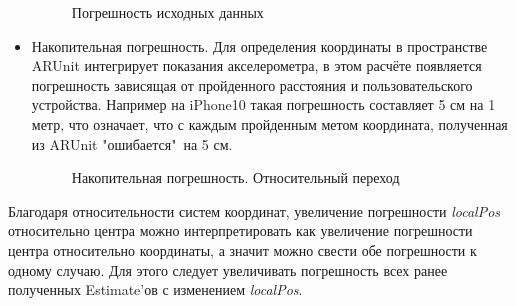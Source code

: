 \documentclass[a4paper, 11pt, titlepage]{article}
\begin{document}
\begin{itemize}
\begin{figure}[H]
\begin{tikzpicture}[scale=0.8]
              \end{tikzpicture}
              \caption{Погрешность исходных данных}
             \end{figure}
             \item Накопительная погрешность. Для определения координаты в пространстве ARUnit интегрирует показания акселерометра,
             в этом расчёте появляется погрешность зависящая от пройденного расстояния и пользовательского устройства. 
             Например на iPhone10 такая погрешность составляет 5 см на 1 метр, что означает, что с каждым пройденным метом 
             координата, полученная из ARUnit "ошибается"\ на 5 см.
             \begin{figure}[H]
              \centering
              \caption{Накопительная погрешность. Относительный переход}
             \end{figure}
          \end{itemize}
          Благодаря относительности систем координат, увеличение погрешности \textit{localPos} относительно центра можно 
          интерпретировать как увеличение погрешности центра относительно координаты, а значит можно свести обе погрешности к одному случаю.
          Для этого следует увеличивать погрешность всех ранее полученных Estimate'ов с изменением \textit{localPos}.
\end{document}

